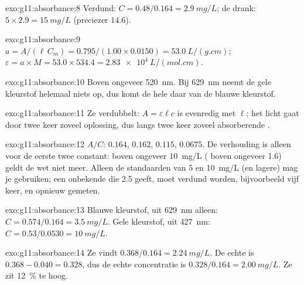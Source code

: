 \begin{solution}{exo:g11:absorbance:8}
Verdund: $C = 0.48 / 0.164 = \qty{2.9}{mg/L}$; de drank:
$5 \times 2.9 = \qty{15}{mg/L}$ (preciezer $14.6$).
\end{solution}

\begin{solution}{exo:g11:absorbance:9}
$a = A / (\ell\, C_m) = 0.795 / (1.00 \times 0.0150) = \qty{53.0}{L/(g.cm)}$;
$\varepsilon = a \times M = 53.0 \times 534.4 = \qty{2.83e4}{L/(mol.cm)}$.
\end{solution}

\begin{solution}{exo:g11:absorbance:10}
Boven ongeveer \qty{520}{nm}. Bij \qty{629}{nm} neemt de gele kleurstof
helemaal niets op, dus komt de hele  daar van de blauwe
kleurstof.
\end{solution}

\begin{solution}{exo:g11:absorbance:11}
Ze verdubbelt: $A = \varepsilon \ell c$ is evenredig met $\ell$; het
licht gaat door twee keer zoveel oplossing, dus langs twee keer zoveel
absorberende .
\end{solution}

\begin{solution}{exo:g11:absorbance:12}
$A/C$: $0.164$, $0.162$, $0.115$, $0.0675$. De verhouding is alleen voor
de eerste twee constant: boven ongeveer \qty{10}{mg/L} (
boven ongeveer 1.6) geldt de wet niet meer. Alleen de standaarden van 5
en \qty{10}{mg/L} (en lagere) mag je gebruiken; een onbekende die 2.5
geeft, moet verdund worden, bijvoorbeeld vijf keer, en opnieuw gemeten.
\end{solution}

\begin{solution}{exo:g11:absorbance:13}
Blauwe kleurstof, uit \qty{629}{nm} alleen: $C = 0.574 / 0.164 = \qty{3.5}{mg/L}$.
Gele kleurstof, uit \qty{427}{nm}: $C = 0.53 / 0.0530 = \qty{10}{mg/L}$.
\end{solution}

\begin{solution}{exo:g11:absorbance:14}
Ze vindt $0.368 / 0.164 = \qty{2.24}{mg/L}$. De echte  is
$0.368 - 0.040 = 0.328$, dus de echte concentratie is
$0.328 / 0.164 = \qty{2.00}{mg/L}$. Ze zit \qty{12}{\percent} te hoog.
\end{solution}

